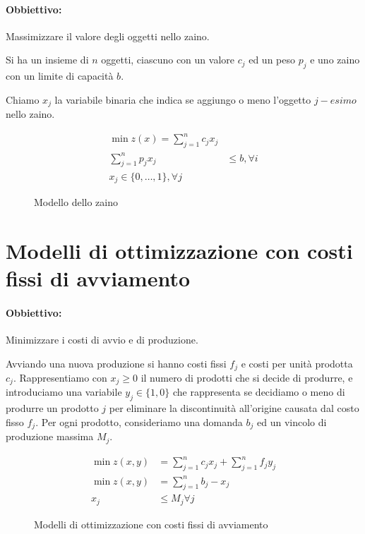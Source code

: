 \documentclass[\main/main.tex]{subfiles}
\begin{document}
\paragraph*{Obbiettivo:} Massimizzare il valore degli oggetti nello zaino.

Si ha un insieme di $n$ oggetti, ciascuno con un valore $c_j$ ed un peso $p_j$ e uno zaino con un limite di capacità $b.$

Chiamo $x_j$ la variabile binaria che indica se aggiungo o meno l'oggetto $j-esimo$ nello zaino.

\begin{figure}
  \begin{align*}
    \min z(x) = \sum_{j=1}^n c_jx_j           \\
    \sum_{j=1}^n p_{j}x_j & \leq b, \forall i \\
    x_j \in \{0,\ldots,1\}, \forall j
  \end{align*}
  \caption{Modello dello zaino}
\end{figure}

\section{Modelli di ottimizzazione con costi fissi di avviamento}
\paragraph*{Obbiettivo:} Minimizzare i costi di avvio e di produzione.

Avviando una nuova produzione si hanno costi fissi $f_j$ e costi per unità prodotta $c_j$. Rappresentiamo con $x_j\geq0$ il numero di prodotti che si decide di produrre, e introduciamo una variabile $y_j \in \{1,0\}$ che rappresenta se decidiamo o meno di produrre un prodotto $j$ per eliminare la discontinuità all'origine causata dal costo fisso $f_j$. Per ogni prodotto, consideriamo una domanda $b_j$ ed un vincolo di produzione massima $M_j$.

\begin{figure}
  \begin{align*}
    \min z(x,y) & = \sum_{j=1}^n c_jx_j + \sum_{j=1}^n f_jy_j \\
    \min z(x,y) & = \sum_{j=1}^n b_j - x_j                    \\
    x_j         & \leq M_j \forall j
  \end{align*}
  \caption{Modelli di ottimizzazione con costi fissi di avviamento}
\end{figure}
\end{document}
